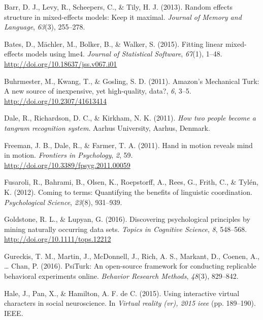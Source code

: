 \documentclass[10pt, letterpaper]{article}
\begin{document}
\setlength{\parindent}{-0.1in} \setlength{\leftskip}{0.125in} \noindent

\hypertarget{refs}{}
\hypertarget{ref-barr2013random}{}
Barr, D. J., Levy, R., Scheepers, C., \& Tily, H. J. (2013). Random
effects structure in mixed-effects models: Keep it maximal.
\emph{Journal of Memory and Language}, \emph{63}(3), 255--278.

\hypertarget{ref-bates2015fitting}{}
Bates, D., Mächler, M., Bolker, B., \& Walker, S. (2015). Fitting linear
mixed-effects models using lme4. \emph{Journal of Statistical Software},
\emph{67}(1), 1--48. \url{http://doi.org/10.18637/jss.v067.i01}

\hypertarget{ref-buhrmester2011amazon}{}
Buhrmester, M., Kwang, T., \& Gosling, S. D. (2011). Amazon's Mechanical
Turk: A new source of inexpensive, yet high-quality, data?, \emph{6},
3--5. \url{http://doi.org/10.2307/41613414}

\hypertarget{ref-dale2011how}{}
Dale, R., Richardson, D. C., \& Kirkham, N. K. (2011). \emph{How two
people become a tangram recognition system}. Aarhus University, Aarhus,
Denmark.

\hypertarget{ref-freeman2011hand}{}
Freeman, J. B., Dale, R., \& Farmer, T. A. (2011). Hand in motion
reveals mind in motion. \emph{Frontiers in Psychology}, \emph{2}, 59.
\url{http://doi.org/10.3389/fpsyg.2011.00059}

\hypertarget{ref-fusaroli2012coming}{}
Fusaroli, R., Bahrami, B., Olsen, K., Roepstorff, A., Rees, G., Frith,
C., \& Tylén, K. (2012). Coming to terms: Quantifying the benefits of
linguistic coordination. \emph{Psychological Science}, \emph{23}(8),
931--939.

\hypertarget{ref-goldstone2016discovering}{}
Goldstone, R. L., \& Lupyan, G. (2016). Discovering psychological
principles by mining naturally occurring data sets. \emph{Topics in
Cognitive Science}, \emph{8}, 548--568.
\url{http://doi.org/10.1111/tops.12212}

\hypertarget{ref-gureckis2016psiturk}{}
Gureckis, T. M., Martin, J., McDonnell, J., Rich, A. S., Markant, D.,
Coenen, A., \ldots{} Chan, P. (2016). PsiTurk: An open-source framework
for conducting replicable behavioral experiments online. \emph{Behavior
Research Methods}, \emph{48}(3), 829--842.

\hypertarget{ref-hale2015using}{}
Hale, J., Pan, X., \& Hamilton, A. F. de C. (2015). Using interactive
virtual characters in social neuroscience. In \emph{Virtual reality
(vr), 2015 ieee} (pp. 189--190). IEEE.
\end{document}
